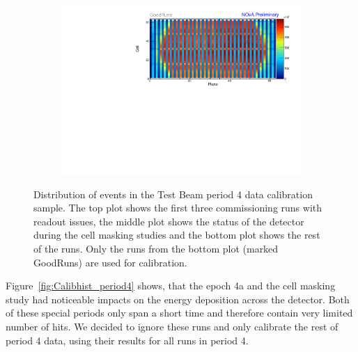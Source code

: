 \begin{figure}[!hbtp]
\begin{subfigure}[b]{\textwidth}
\end{subfigure}
\begin{subfigure}[b]{\textwidth}
\centering
\includegraphics[width=\textwidth]{Plots/TBCalibration/Attenprofs_P4Data_CellPlane_GoodRuns.pdf}
\end{subfigure}
\caption[Plane-Cell distribution of hits for the period 4 data sample]{Distribution of events in the Test Beam period 4 data calibration sample. The top plot shows the first three commissioning runs with readout issues, the middle plot shows the status of the detector during the cell masking studies and the bottom plot shows the rest of the runs. Only the runs from the bottom plot (marked GoodRuns) are used for calibration.}
\label{fig:CalibhistMap_period4}
\end{figure}

Figure~\ref{fig:Calibhist_period4} shows, that the epoch 4a and the cell masking study had noticeable impacts on the energy deposition across the detector. Both of these special periods only span a short time and therefore contain very limited number of hits. We decided to ignore these runs and only calibrate the rest of period 4 data, using their results for all runs in period 4. 

